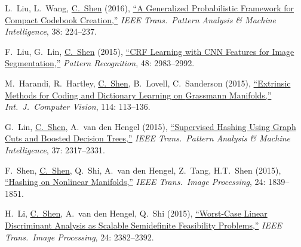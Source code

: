 \documentclass[9pt, a4paper]{article}
\newcommand{\years}[1]{\marginnote{\scriptsize #1}}
\def\highlight{\uline}
\begin{document}
\medskip

\years{2016} L.~Liu, L.~Wang, \highlight{C.~Shen} (2016),
\href{http://www.google.com/search?lr=&ie=UTF-8&oe=UTF-8&q=A+Generalized+Probabilistic+Framework+for+Compact+Codebook+Creation+Lingqiao+Liu%2C+Lei+Wang%2C+Chunhua+Shen}{``A Generalized Probabilistic Framework for Compact Codebook Creation,{}''}
\emph{IEEE Trans.\  Pattern Analysis \& Machine Intelligence}, 38: 224--237.

\medskip

\years{2015} F.~Liu, G.~Lin, \highlight{C.~Shen} (2015),
\href{http://www.google.com/search?lr=&ie=UTF-8&oe=UTF-8&q=CRF+Learning+with+CNN+Features+for+Image+Segmentation+Fayao+Liu%2C+Guosheng+Lin%2C+Chunhua+Shen}{``{CRF} Learning with {CNN} Features for Image Segmentation,{}''}
\emph{Pattern Recognition}, 48: 2983--2992.

\medskip

\years{2015} M.~Harandi, R.~Hartley, \highlight{C.~Shen}, B.~Lovell, C.~Sanderson (2015),
\href{http://www.google.com/search?lr=&ie=UTF-8&oe=UTF-8&q=Extrinsic+Methods+for+Coding+and+Dictionary+Learning+on+Grassmann+Manifolds+Mehrtash+Harandi%2C+Richard+Hartley%2C+Chunhua+Shen%2C+Brian+Lovell%2C+Conrad+Sanderson}{``Extrinsic Methods for Coding and Dictionary Learning on {G}rassmann Manifolds,{}''}
\emph{Int.\ J.\  Computer Vision}, 114: 113--136.

\medskip

\years{2015} G.~Lin, \highlight{C.~Shen}, A.~van den Hengel (2015),
\href{http://www.google.com/search?lr=&ie=UTF-8&oe=UTF-8&q=Supervised+Hashing+Using+Graph+Cuts+and+Boosted+Decision+Trees+Guosheng+Lin%2C+Chunhua+Shen%2C+Anton+van+den+Hengel}{``Supervised Hashing Using Graph Cuts and Boosted Decision Trees,{}''}
\emph{IEEE Trans.\  Pattern Analysis \& Machine Intelligence}, 37: 2317--2331.

\medskip

\years{2015} F.~Shen, \highlight{C.~Shen}, Q.~Shi, A.~van den Hengel, Z.~Tang, H.T.~Shen (2015),
\href{http://www.google.com/search?lr=&ie=UTF-8&oe=UTF-8&q=Hashing+on+Nonlinear+Manifolds+Fumin+Shen%2C+Chunhua+Shen%2C+Qinfeng+Shi%2C+Anton+van+den+Hengel%2C+Zhenmin+Tang%2C+Heng+Tao+Shen}{``Hashing on Nonlinear Manifolds,{}''}
\emph{IEEE Trans.\  Image Processing}, 24: 1839--1851.

\medskip

\years{2015} H.~Li, \highlight{C.~Shen}, A.~van den Hengel, Q.~Shi (2015),
\href{http://www.google.com/search?lr=&ie=UTF-8&oe=UTF-8&q=Worst-Case+Linear+Discriminant+Analysis+as+Scalable+Semidefinite+Feasibility+Problems+Hui+Li%2C+Chunhua+Shen%2C+Anton+van+den+Hengel%2C+Qinfeng+Shi}{``Worst-Case Linear Discriminant Analysis as Scalable Semidefinite Feasibility Problems,{}''}
\emph{IEEE Trans.\  Image Processing}, 24: 2382--2392.
\end{document}
